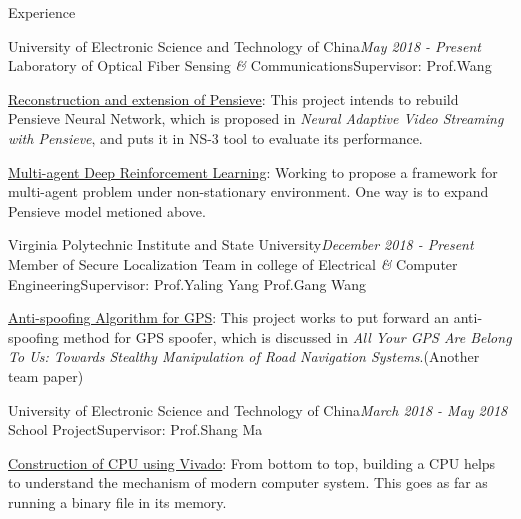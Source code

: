 \documentclass{resume} %
\begin{document}
\begin{rSection}{Experience}

\begin{rSubsection}{\vspace{-1em} University of Electronic Science and Technology of China}{\em May 2018 - Present}{ Laboratory of Optical Fiber Sensing {\em \&} Communications}{Supervisor: Prof.Wang}
\item \underline{Reconstruction and extension of Pensieve}: This project intends to rebuild Pensieve Neural Network, which is proposed in {\em Neural Adaptive Video Streaming with Pensieve}, and puts it in NS-3 tool to evaluate its performance.
\item \underline{Multi-agent Deep Reinforcement Learning}: Working to propose a framework for multi-agent problem under non-stationary environment. One way is to expand Pensieve model metioned above.
\end{rSubsection}

\begin{rSubsection}{Virginia Polytechnic Institute and State University}{\em December 2018 - Present}{ Member of Secure Localization Team in college of Electrical {\em \&} Computer Engineering}{Supervisor: Prof.Yaling Yang Prof.Gang Wang}
\item \underline{Anti-spoofing Algorithm for GPS}: This project works to put forward an anti-spoofing method for GPS spoofer, which is discussed in {\em All Your GPS Are Belong To Us: Towards Stealthy Manipulation of Road Navigation Systems}.(Another team paper)
\end{rSubsection}

\begin{rSubsection}{University of Electronic Science and Technology of China}{\em March 2018 - May 2018}{ School Project}{Supervisor: Prof.Shang Ma}
\item \underline{Construction of CPU using Vivado}: From bottom to top, building a CPU helps to understand the mechanism of modern computer system. This goes as far as running a binary file in its memory.
\end{rSubsection}

\end{rSection}



\end{document}
